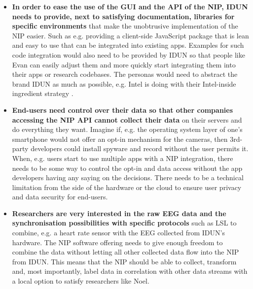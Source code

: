 \begin{itemize}
  \item \textbf{In order to ease the use of the GUI and the API of the NIP, IDUN needs to provide, next to satisfying documentation, libraries for specific environments} that make the unobtrusive implementation of the NIP easier. Such as e.g. providing a client-side JavaScript package that is lean and easy to use that can be integrated into existing apps. Examples for such code integration would also need to be provided by IDUN so that people like Evan can easily adjust them and more quickly start integrating them into their apps or research codebases. The personas would need to abstract the brand IDUN as much as possible, e.g. Intel is doing with their Intel-inside ingredient strategy \citep{intel_ingredient_nodate}.
  \item \textbf{End-users need control over their data so that other companies accessing the NIP API cannot collect their data} on their servers and do everything they want. Imagine if, e.g. the operating system layer of one's smartphone would not offer an opt-in mechanism for the cameras, then 3rd-party developers could install spyware and record without the user permits it. When, e.g. users start to use multiple apps with a NIP integration, there needs to be some way to control the opt-in and data access without the app developers having any saying on the decisions. There needs to be a technical limitation from the side of the hardware or the cloud to ensure user privacy and data security for end-users.
  \item \textbf{Researchers are very interested in the raw EEG data and the synchronisation possibilities with specific protocols} such as LSL to combine, e.g. a heart rate sensor with the EEG collected from IDUN's hardware. The NIP software offering needs to give enough freedom to combine the data without letting all other collected data flow into the NIP from IDUN. This means that the NIP should be able to collect, transform and, most importantly, label data in correlation with other data streams with a local option to satisfy researchers like Noel.
\end{itemize}

